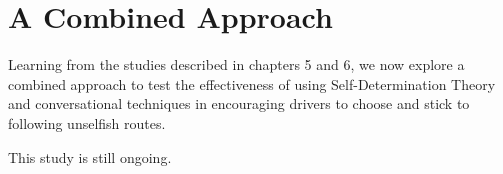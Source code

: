 \chapter{A Combined Approach}
Learning from the studies described in chapters 5 and 6, we now explore a combined approach to test the effectiveness of using Self-Determination Theory and conversational techniques in encouraging drivers to choose and stick to following unselfish routes. 

This study is still ongoing. 